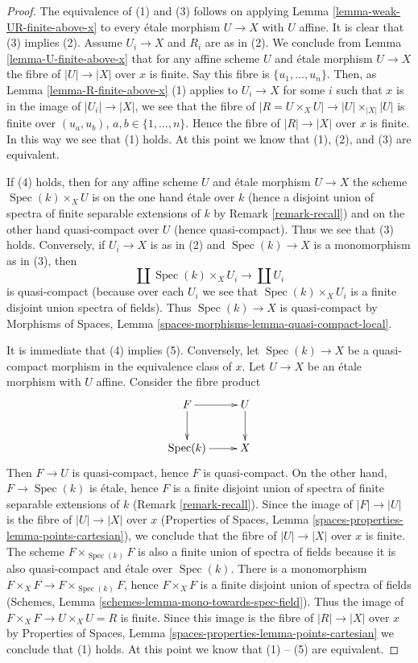 \documentclass{stacks-project}
\theoremstyle{plain}
\theoremstyle{definition}
\theoremstyle{remark}
\numberwithin{equation}{subsection}
\def\Spec{\mathop{\mathrm{Spec}}}
\begin{document}
\begin{proof}
The equivalence of (1) and (3) follows on applying
Lemma \ref{lemma-weak-UR-finite-above-x}
to every \'etale morphism $U \to X$ with $U$ affine.
It is clear that (3) implies (2).
Assume $U_i \to X$ and $R_i$ are as in (2). We conclude from
Lemma \ref{lemma-U-finite-above-x}
that for any affine scheme $U$ and \'etale morphism $U \to X$
the fibre of $|U| \to |X|$ over $x$ is finite.
Say this fibre is $\{u_1, \ldots, u_n\}$. Then, as
Lemma \ref{lemma-R-finite-above-x} (1)
applies to $U_i \to X$ for some $i$ such that $x$ is in the image of
$|U_i| \to |X|$, we see that the fibre of
$|R = U \times_X U| \to |U| \times_{|X|} |U|$
is finite over $(u_a, u_b)$, $a, b \in \{1, \ldots, n\}$.
Hence the fibre of $|R| \to |X|$ over $x$ is finite.
In this way we see that (1) holds. At this point we know that
(1), (2), and (3) are equivalent.

\medskip\noindent
If (4) holds, then for any affine scheme $U$ and \'etale morphism
$U \to X$ the scheme $\Spec(k) \times_X U$ is on the one hand
\'etale over $k$ (hence a disjoint union of spectra of finite separable
extensions of $k$ by
Remark \ref{remark-recall})
and on the other hand quasi-compact over $U$ (hence quasi-compact).
Thus we see that (3) holds.
Conversely, if $U_i \to X$ is as in (2) and $\Spec(k) \to X$
is a monomorphism as in (3), then
$$
\coprod \Spec(k) \times_X U_i
\longrightarrow
\coprod U_i
$$
is quasi-compact (because over each $U_i$ we see that
$\Spec(k) \times_X U_i$ is a finite disjoint union spectra of fields).
Thus $\Spec(k) \to X$ is quasi-compact by
Morphisms of Spaces, Lemma \ref{spaces-morphisms-lemma-quasi-compact-local}.

\medskip\noindent
It is immediate that (4) implies (5). Conversely, let $\Spec(k) \to X$
be a quasi-compact morphism in the equivalence class of $x$. Let $U \to X$
be an \'etale morphism with $U$ affine. Consider the fibre product
$$
\xymatrix{
F \ar[r] \ar[d] & U \ar[d] \\
\Spec(k) \ar[r] & X
}
$$
Then $F \to U$ is quasi-compact, hence $F$ is quasi-compact.
On the other hand, $F \to \Spec(k)$ is \'etale, hence $F$ is a
finite disjoint union of spectra of finite separable extensions of $k$
(Remark \ref{remark-recall}). Since the image of $|F| \to |U|$
is the fibre of $|U| \to |X|$ over $x$ (Properties of Spaces, Lemma
\ref{spaces-properties-lemma-points-cartesian}), we conclude that
the fibre of $|U| \to |X|$ over $x$ is finite. The scheme
$F \times_{\Spec(k)} F$ is also a finite union of spectra of fields
because it is also quasi-compact and \'etale over $\Spec(k)$.
There is a monomorphism
$F \times_X F \to F \times_{\Spec(k)} F$, hence $F \times_X F$ is
a finite disjoint union of spectra of fields
(Schemes, Lemma \ref{schemes-lemma-mono-towards-spec-field}).
Thus the image of $F \times_X F \to U \times_X U = R$ is finite.
Since this image is the fibre of $|R| \to |X|$ over $x$ by
Properties of Spaces, Lemma \ref{spaces-properties-lemma-points-cartesian}
we conclude that (1) holds. At this point we know that
(1) -- (5) are equivalent.


\end{proof}
\end{document}
